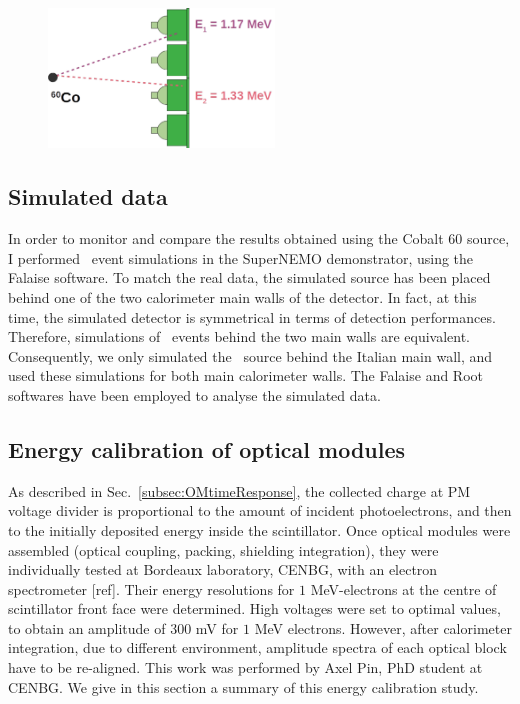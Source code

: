 \begin{figure}[h]
  \centering
  \includegraphics[width=6cm]{commissioning/fig_commissioning/Co_setup.pdf}
  \caption{
\label{fig:}}
\end{figure}


\subsection{Simulated data}
\label{subsec:Co_simus}

In order to monitor and compare the results obtained using the Cobalt $60$ source, I performed \Co\ event simulations in the SuperNEMO demonstrator, using the Falaise software.
To match the real data, the simulated source has been placed behind one of the two calorimeter main walls of the detector.
In fact, at this time, the simulated detector is symmetrical in terms of detection performances.
Therefore, simulations of \Co\ events behind the two main walls are equivalent.
Consequently, we only simulated the \Co\ source behind the Italian main wall, and used these simulations for both main calorimeter walls.
The Falaise and Root softwares have been employed to analyse the simulated data.


\subsection{Energy calibration of optical modules}
\label{subsec:OMenergyCalib}

As described in Sec.~\ref{subsec:OMtimeResponse}, the collected charge at PM voltage divider is proportional to the amount of incident photoelectrons, and then to the initially deposited energy inside the scintillator.
Once optical modules were assembled (optical coupling, packing, shielding integration), they were individually tested at Bordeaux laboratory, CENBG, with an electron spectrometer [ref].
Their energy resolutions for $1$ MeV-electrons at the centre of scintillator front face were determined.
High voltages were set to optimal values, to obtain an amplitude of $300$ mV for $1$ MeV electrons.
However, after calorimeter integration, due to different environment, amplitude spectra of each optical block have to be re-aligned.
This work was performed by Axel Pin, PhD student at CENBG.
We give in this section a summary of this energy calibration study.

